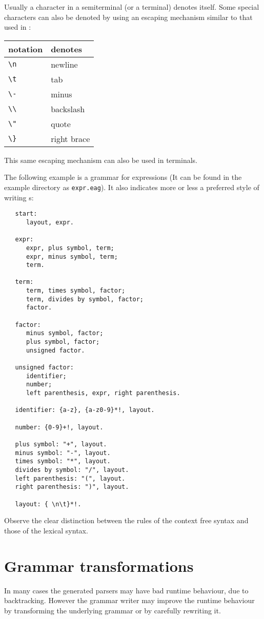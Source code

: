 Usually a character in a semiterminal (or a terminal) denotes itself.
Some special characters can also be denoted by using an escaping
mechanism similar to that used in \Cns:
\begin {center}
\begin {tabular}{|l|l|}
notation & denotes\\
\hline
\verb+\n+ & newline \\
\verb+\t+ & tab \\
\verb+\-+ & minus \\
\verb+\\+ & backslash \\
\verb+\"+ & quote \\
\verb+\}+ & right brace
\end {tabular}
\end {center}
This same escaping mechanism can also be used in terminals.

The following example is a grammar for expressions (It can be
found in the example directory as {\tt expr.eag}). It also
indicates more or less a preferred style of writing \EAGns s:
\begin{verbatim}
   start:
      layout, expr.
   
   expr:
      expr, plus symbol, term;
      expr, minus symbol, term;
      term.
   
   term:
      term, times symbol, factor;
      term, divides by symbol, factor;
      factor.
   
   factor:
      minus symbol, factor;
      plus symbol, factor;
      unsigned factor.
   
   unsigned factor:
      identifier;
      number;
      left parenthesis, expr, right parenthesis.
   
   identifier: {a-z}, {a-z0-9}*!, layout.
   
   number: {0-9}+!, layout.
   
   plus symbol: "+", layout.
   minus symbol: "-", layout.
   times symbol: "*", layout.
   divides by symbol: "/", layout.
   left parenthesis: "(", layout.
   right parenthesis: ")", layout.
   
   layout: { \n\t}*!.
\end{verbatim}
Observe the clear distinction between the rules of the
context free syntax and those of the lexical syntax.
\section {Grammar transformations}
In many cases the generated parsers may have bad runtime behaviour,
due to backtracking. However the grammar writer may improve
the runtime behaviour by transforming the underlying grammar
or by carefully rewriting it.


